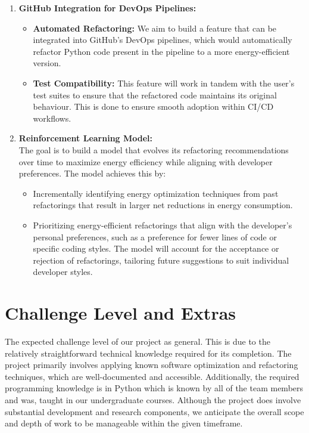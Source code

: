 \documentclass{article}
\begin{document}
\begin{enumerate}
    \item \textbf{GitHub Integration for DevOps Pipelines:}
    \begin{itemize}
        \item \textbf{Automated Refactoring:} We aim to build a feature that can be integrated into GitHub’s DevOps pipelines, which would automatically refactor Python code present in the pipeline to a more energy-efficient version.
        \item \textbf{Test Compatibility:} This feature will work in tandem with the user's test suites to ensure that the refactored code maintains its original behaviour. This is done to ensure smooth adoption within CI/CD workflows.
    \end{itemize}

    \item \textbf{Reinforcement Learning Model:} \\
    The goal is to build a model that evolves its refactoring recommendations over time to maximize energy efficiency while aligning with developer preferences. The model achieves this by:
    \begin{itemize}
        \item Incrementally identifying energy optimization techniques from past refactorings that result in larger net reductions in energy consumption.
        \item Prioritizing energy-efficient refactorings that align with the developer's personal preferences, such as a preference for fewer lines of code or specific coding styles. The model will account for the acceptance or rejection of refactorings, tailoring future suggestions to suit individual developer styles.
    \end{itemize}
\end{enumerate}


\section{Challenge Level and Extras}

The expected challenge level of our project as general. This is due to the
relatively straightforward technical knowledge required for its completion.
The project primarily involves applying known software optimization and
refactoring techniques, which are well-documented and accessible.
Additionally, the required programming knowledge is in Python which is known
by all of the team members and was, taught in our undergraduate courses.
Although the project does involve substantial development and research components,
we anticipate the overall scope and depth of work to be manageable within the
given timeframe. \\
\end{document}
